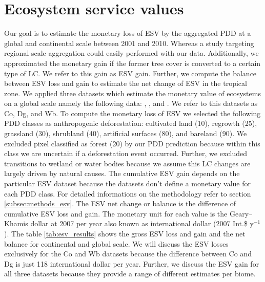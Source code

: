 	\section{Ecosystem service values}
		Our goal is to estimate the monetary loss of \ac{ESV} by the aggregated \ac{PDD} at a global and continental scale between 2001 and 2010. Whereas a study targeting regional scale aggregation could easily performed with our data. Additionally, we approximated the monetary gain if the former tree cover is converted to a certain type of \ac{LC}. We refer to this gain as \ac{ESV} gain. Further, we compute the balance between \ac{ESV} loss and gain to estimate the net change of \ac{ESV} in the tropical zone. We applied three datasets which estimate the monetary value of ecosystems on a global scale namely the following data: \citet{Groot2012}, \citet{Costanza2014}, and \citet{Siikamaki2015}. We refer to this datasets as Co, Dg, and Wb. To compute the monetary loss of \ac{ESV} we selected the following \ac{PDD} classes as anthropogenic deforestation: cultivated land (10), regrowth (25), grassland (30), shrubland (40), artificial surfaces (80), and bareland (90). We excluded pixel classified as forest (20) by our \ac{PDD} prediction because within this class we are uncertain if a deforestation event occurred. Further, we excluded transitions to wetland or water bodies because we assume this \ac{LC} changes are largely driven by natural causes. The cumulative \ac{ESV} gain depends on the particular \ac{ESV} dataset because the datasets don't define a monetary value for each \ac{PDD} class. For detailed informations on the methodology refer to section \ref{subsec:methods_esv}. The \ac{ESV} net change or balance is the difference of cumulative \ac{ESV} loss and gain. The monetary unit for each value is the Geary–Khamis dollar at 2007 per year also known as international dollar (2007 Int.\$ y$^{-1}$). The table \ref{tab:esv_results} shows the gross \ac{ESV} loss and gain and the net balance for continental and global scale. We will discuss the \ac{ESV} losses exclusively for the Co and Wb datasets because the difference between Co and Dg is just 118 international dollar per year. Further, we discuss the \ac{ESV} gain for all three datasets because they provide a range of different estimates per biome.

